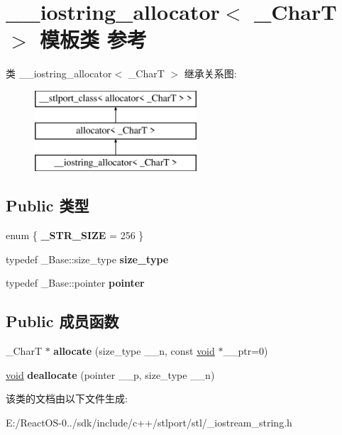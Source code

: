 \hypertarget{class____iostring__allocator}{}\section{\+\_\+\+\_\+iostring\+\_\+allocator$<$ \+\_\+\+CharT $>$ 模板类 参考}
\label{class____iostring__allocator}
类 \+\_\+\+\_\+iostring\+\_\+allocator$<$ \+\_\+\+CharT $>$ 继承关系图\+:\begin{figure}[H]
\begin{center}
\leavevmode
\includegraphics[height=3.000000cm]{class____iostring__allocator}
\end{center}
\end{figure}
\subsection*{Public 类型}
\begin{DoxyCompactItemize}
\item 
\mbox{\label{class____iostring__allocator_ad72e2c3afebcd4861d735c2634933070}} 
enum \{ {\bfseries \+\_\+\+S\+T\+R\+\_\+\+S\+I\+ZE} = 256
 \}
\item 
\mbox{\label{class____iostring__allocator_a321730f7ba3211e2a54b9280c1f29fc6}} 
typedef \+\_\+\+Base\+::size\+\_\+type {\bfseries size\+\_\+type}
\item 
\mbox{\label{class____iostring__allocator_ad6755254a1f046fb59b45ea128ee7810}} 
typedef \+\_\+\+Base\+::pointer {\bfseries pointer}
\end{DoxyCompactItemize}
\subsection*{Public 成员函数}
\begin{DoxyCompactItemize}
\item 
\mbox{\label{class____iostring__allocator_aeba3eacb2c64da7a8639046d45fef342}} 
\+\_\+\+CharT $\ast$ {\bfseries allocate} (size\+\_\+type \+\_\+\+\_\+n, const \hyperlink{interfacevoid}{void} $\ast$\+\_\+\+\_\+ptr=0)
\item 
\mbox{\label{class____iostring__allocator_a39f8349d68e7166135a2d6debed3e211}} 
\hyperlink{interfacevoid}{void} {\bfseries deallocate} (pointer \+\_\+\+\_\+p, size\+\_\+type \+\_\+\+\_\+n)
\end{DoxyCompactItemize}


该类的文档由以下文件生成\+:\begin{DoxyCompactItemize}
\item 
E\+:/\+React\+O\+S-\/0../sdk/include/c++/stlport/stl/\+\_\+iostream\+\_\+string.\+h\end{DoxyCompactItemize}
